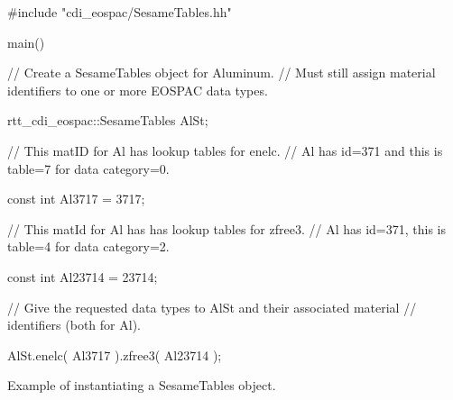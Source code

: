 \documentclass[11pt]{nmemo}
\newenvironment{codeExample}
{\footnotesize
  \VerbatimEnvironment
  \begin{SaveVerbatim}{\mycode}}%
  {\end{SaveVerbatim}%
  \noindent%
  \parashade[.950]{sharpcorners}{\gdef\outlineboxwidth{.5}%
    \UseVerbatim{\mycode}}\normalsize}
\begin{document}
\begin{cxxSampleCode}
\begin{codeExample}
#include "cdi_eospac/SesameTables.hh"

main()
{
  // Create a SesameTables object for Aluminum.
  // Must still assign material identifiers to one or more EOSPAC data types.

  rtt_cdi_eospac::SesameTables AlSt;

  // This matID for Al has lookup tables for enelc.
  // Al has id=371 and this is table=7 for data category=0.

  const int Al3717 = 3717;

  // This matId for Al has has lookup tables for zfree3.
  // Al has id=371, this is table=4 for data category=2.

  const int Al23714 = 23714;

 // Give the requested data types to AlSt and their associated material
 // identifiers (both for Al).

  AlSt.enelc( Al3717 ).zfree3( Al23714 );
}
\end{codeExample}
\caption{Example of instantiating a SesameTables object.}
\label{codeExample:SesameTablesInstantiation}
\end{cxxSampleCode}
\end{document}
